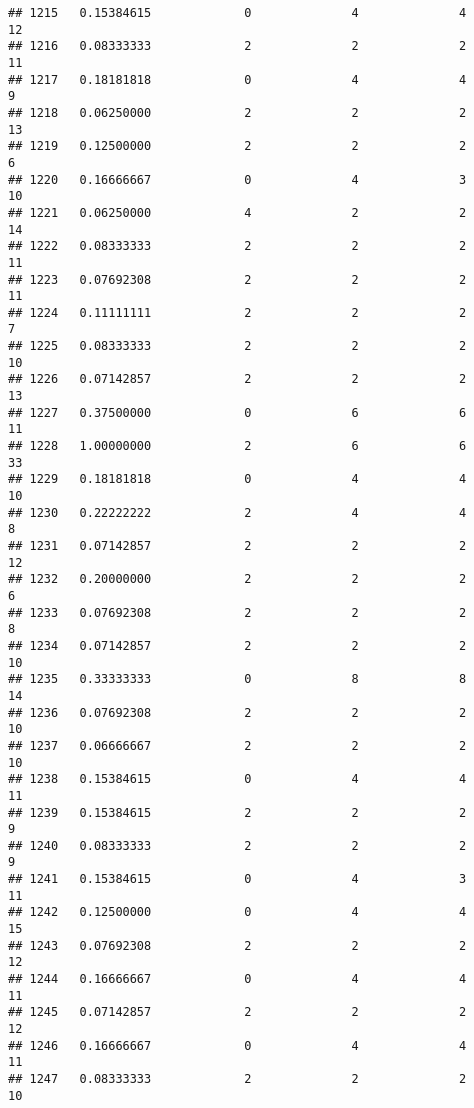 \documentclass[
]{article}
\begin{document}
\begin{verbatim}
## 1215   0.15384615             0              4              4             12
## 1216   0.08333333             2              2              2             11
## 1217   0.18181818             0              4              4              9
## 1218   0.06250000             2              2              2             13
## 1219   0.12500000             2              2              2              6
## 1220   0.16666667             0              4              3             10
## 1221   0.06250000             4              2              2             14
## 1222   0.08333333             2              2              2             11
## 1223   0.07692308             2              2              2             11
## 1224   0.11111111             2              2              2              7
## 1225   0.08333333             2              2              2             10
## 1226   0.07142857             2              2              2             13
## 1227   0.37500000             0              6              6             11
## 1228   1.00000000             2              6              6             33
## 1229   0.18181818             0              4              4             10
## 1230   0.22222222             2              4              4              8
## 1231   0.07142857             2              2              2             12
## 1232   0.20000000             2              2              2              6
## 1233   0.07692308             2              2              2              8
## 1234   0.07142857             2              2              2             10
## 1235   0.33333333             0              8              8             14
## 1236   0.07692308             2              2              2             10
## 1237   0.06666667             2              2              2             10
## 1238   0.15384615             0              4              4             11
## 1239   0.15384615             2              2              2              9
## 1240   0.08333333             2              2              2              9
## 1241   0.15384615             0              4              3             11
## 1242   0.12500000             0              4              4             15
## 1243   0.07692308             2              2              2             12
## 1244   0.16666667             0              4              4             11
## 1245   0.07142857             2              2              2             12
## 1246   0.16666667             0              4              4             11
## 1247   0.08333333             2              2              2             10

\end{verbatim}
\end{document}
